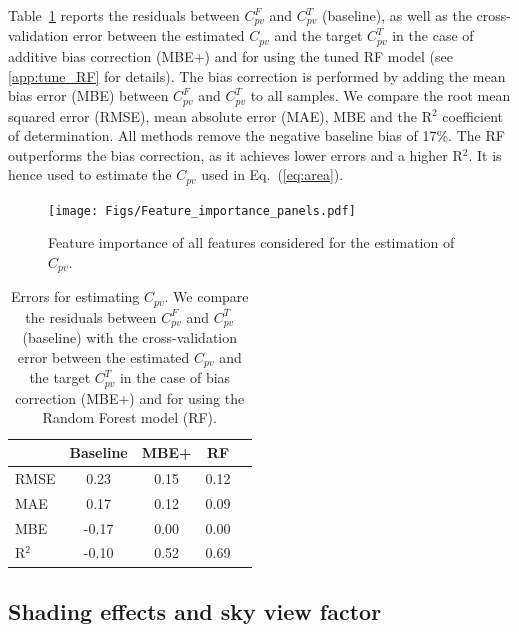 Table~\ref{tab:errors_Cpv} reports the residuals between $C_{\mathit{pv}}^F$ and $C_{\mathit{pv}}^T$ (baseline), as well as the cross-validation error between the estimated $C_{\mathit{pv}}$ and the target $C_{\mathit{pv}}^T$ in the case of additive bias correction (MBE+) and for using the tuned RF model (see \ref{app:tune_RF} for details).
The bias correction is performed by adding the mean bias error (MBE) between $C_{\mathit{pv}}^F$ and $C_{\mathit{pv}}^T$  to all samples. 
We compare the root mean squared error (RMSE), mean absolute error (MAE), MBE and the R$^2$ coefficient of determination. All methods remove the negative baseline bias of 17\%. The RF outperforms the bias correction, as it achieves lower errors and a higher R$^2$. It is hence used to estimate the $C_{\mathit{pv}}$ used in Eq.~(\ref{eq:area}).

\begin{figure}[tb]
\centering
  \texttt{[image: Figs/Feature\_importance\_panels.pdf]}
\caption{Feature importance of all features considered for the estimation of $C_{\mathit{pv}}$.
}
\label{fig:RF_Cpv}
\end{figure}

\begin{table}[tb]
\centering
\footnotesize
\caption{Errors for estimating $C_{\mathit{pv}}$. We compare the residuals between $C_{\mathit{pv}}^F$ and $C_{\mathit{pv}}^T$ (baseline) with the cross-validation error between the estimated $C_{\mathit{pv}}$ and the target $C_{\mathit{pv}}^T$ in the case of bias correction (MBE+) and for using the Random Forest model (RF).}
\label{tab:errors_Cpv}
\begin{tabular}{lcccc}
\hline
      & \textbf{Baseline} & \textbf{MBE+}  & \textbf{RF}   \\ \hline
RMSE  & 0.23     & 0.15  & 0.12 \\
MAE   & 0.17     & 0.12  & 0.09 \\
MBE   & -0.17    & 0.00  & 0.00 \\
R$^2$ & -0.10    & 0.52  & 0.69 \\ \hline
\end{tabular}
\end{table}


\subsection{Shading effects and sky view factor}
\label{shade}
\label{svf}


